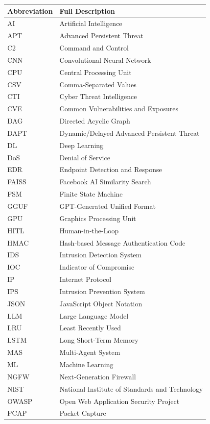 \documentclass[12pt,a4paper]{report}
\begin{document}
\begin{longtable}{lp{}}
\textbf{Abbreviation} & \textbf{Full Description} \\
\midrule
AI & Artificial Intelligence \\
APT & Advanced Persistent Threat \\
C2 & Command and Control \\
CNN & Convolutional Neural Network \\
CPU & Central Processing Unit \\
CSV & Comma-Separated Values \\
CTI & Cyber Threat Intelligence \\
CVE & Common Vulnerabilities and Exposures \\
DAG & Directed Acyclic Graph \\
DAPT & Dynamic/Delayed Advanced Persistent Threat \\
DL & Deep Learning \\
DoS & Denial of Service \\
EDR & Endpoint Detection and Response \\
FAISS & Facebook AI Similarity Search \\
FSM & Finite State Machine \\
GGUF & GPT-Generated Unified Format \\
GPU & Graphics Processing Unit \\
HITL & Human-in-the-Loop \\
HMAC & Hash-based Message Authentication Code \\
IDS & Intrusion Detection System \\
IOC & Indicator of Compromise \\
IP & Internet Protocol \\
IPS & Intrusion Prevention System \\
JSON & JavaScript Object Notation \\
LLM & Large Language Model \\
LRU & Least Recently Used \\
LSTM & Long Short-Term Memory \\
MAS & Multi-Agent System \\
ML & Machine Learning \\
NGFW & Next-Generation Firewall \\
NIST & National Institute of Standards and Technology \\
OWASP & Open Web Application Security Project \\
PCAP & Packet Capture \\

\end{longtable}
\end{document}
